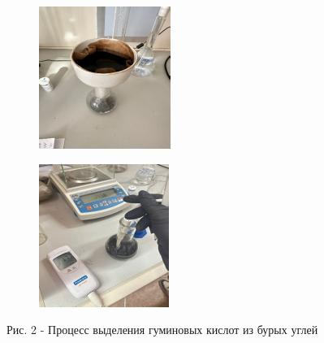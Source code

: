 \begin{figure}[H]
\begin{subfigure}[b]{0.32\textwidth}
    \end{subfigure}
    \begin{subfigure}[b]{0.32\textwidth}
        \centering
        \includegraphics[width=\textwidth, height=\textwidth]{media/gorn3/image8}
    \end{subfigure}
    \begin{subfigure}[b]{0.32\textwidth}
        \centering
        \includegraphics[width=\textwidth, height=\textwidth]{media/gorn3/image9}
    \end{subfigure}
    \caption*{Рис. 2 - Процесс выделения гуминовых кислот из бурых углей}
\end{figure}

